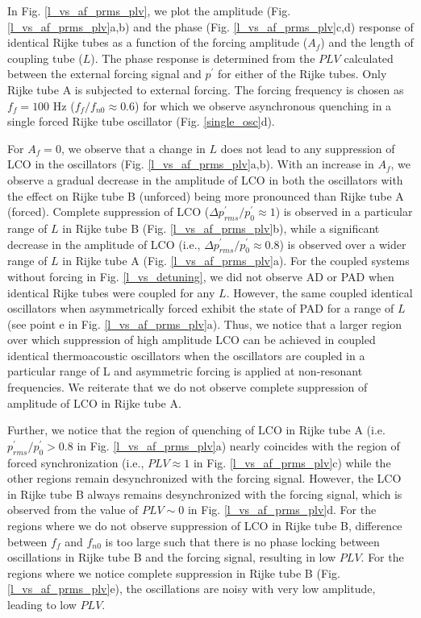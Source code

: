 \documentclass[%
preprint,
 amsmath,amssymb,
 aps,
 pra,
]{revtex4-2}
\begin{document}
In Fig. \ref{l_vs_af_prms_plv}, we plot the amplitude (Fig. \ref{l_vs_af_prms_plv}a,b) and the phase (Fig. \ref{l_vs_af_prms_plv}c,d) response of identical Rijke tubes as a function of the forcing amplitude ($A_f$) and the length of coupling tube ($L$). The phase response is determined from the $PLV$ calculated between the external forcing signal and $p^\prime$ for either of the Rijke tubes. Only Rijke tube A is subjected to external forcing. The forcing frequency is chosen as $f_f=100$ Hz ($f_f/f_{n0}\approx 0.6$) for which we observe asynchronous quenching in a single forced Rijke tube oscillator (Fig. \ref{single_osc}d). 

For $A_f=0$, we observe that a change in $L$ does not lead to any suppression of LCO in the oscillators (Fig. \ref{l_vs_af_prms_plv}a,b). With an increase in $A_f$, we observe a gradual decrease in the amplitude of LCO in both the oscillators with the effect on Rijke tube B (unforced) being more pronounced than Rijke tube A (forced). Complete suppression of LCO ($\Delta p^\prime_{rms}/p^\prime_{0} \approx 1$) is observed in a particular range of $L$ in Rijke tube B (Fig. \ref{l_vs_af_prms_plv}b), while a significant decrease in the amplitude of LCO (i.e., $\Delta p^\prime_{rms}/p^\prime_{0} \approx 0.8 $) is observed over a wider range of $L$ in Rijke tube A (Fig. \ref{l_vs_af_prms_plv}a). For the coupled systems without forcing in Fig. \ref{l_vs_detuning}, we did not observe AD or PAD when identical Rijke tubes were coupled for any $L$. However, the same coupled identical oscillators when asymmetrically forced exhibit the state of PAD for a range of $L$ (see point e in Fig. \ref{l_vs_af_prms_plv}a). Thus, we notice that a larger region over which suppression of high amplitude LCO can be achieved in coupled identical thermoacoustic oscillators when the oscillators are coupled in a particular range of L and asymmetric forcing is applied at non-resonant frequencies. We reiterate that we do not observe complete suppression of amplitude of LCO in Rijke tube A. 

Further, we notice that the region of quenching of LCO in Rijke tube A (i.e. $p^\prime_{rms}/p^\prime_{0}>0.8$ in Fig. \ref{l_vs_af_prms_plv}a) nearly coincides with the region of forced synchronization (i.e., $PLV \approx 1$ in Fig. \ref{l_vs_af_prms_plv}c) while the other regions remain desynchronized with the forcing signal. However, the LCO in Rijke tube B always remains desynchronized with the forcing signal, which is observed from the value of $PLV \sim 0$ in Fig. \ref{l_vs_af_prms_plv}d. For the regions where we do not observe suppression of LCO in Rijke tube B, difference between $f_f$ and $f_{n0}$ is too large such that there is no phase locking between oscillations in Rijke tube B and the forcing signal, resulting in low $PLV$. For the regions where we notice complete suppression in Rijke tube B (Fig. \ref{l_vs_af_prms_plv}e), the oscillations are noisy with very low amplitude, leading to low $PLV$.
\end{document}
